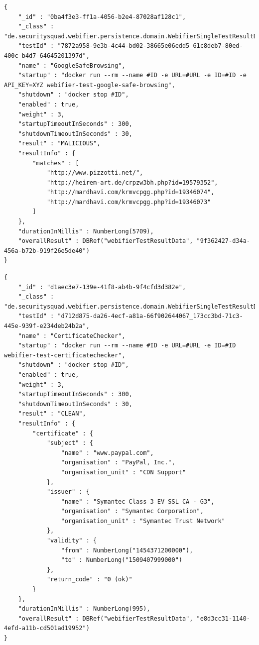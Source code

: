 \begin{scriptsize}
\begin{lstlisting}
{
    "_id" : "0ba4f3e3-ff1a-4056-b2e4-87028af128c1",
    "_class" : "de.securitysquad.webifier.persistence.domain.WebifierSingleTestResultData",
    "testId" : "7872a958-9e3b-4c44-bd02-38665e06edd5_61c8deb7-80ed-400c-b4d7-64645201397d",
    "name" : "GoogleSafeBrowsing",
    "startup" : "docker run --rm --name #ID -e URL=#URL -e ID=#ID -e API_KEY=XYZ webifier-test-google-safe-browsing",
    "shutdown" : "docker stop #ID",
    "enabled" : true,
    "weight" : 3,
    "startupTimeoutInSeconds" : 300,
    "shutdownTimeoutInSeconds" : 30,
    "result" : "MALICIOUS",
    "resultInfo" : {
        "matches" : [
            "http://www.pizzotti.net/",
            "http://heirem-art.de/crpzw3bh.php?id=19579352",
            "http://mardhavi.com/krmvcpgg.php?id=19346074",
            "http://mardhavi.com/krmvcpgg.php?id=19346073"
        ]
    },
    "durationInMillis" : NumberLong(5709),
    "overallResult" : DBRef("webifierTestResultData", "9f362427-d34a-456a-b72b-919f26e5de40")
}
\end{lstlisting}
\end{scriptsize}

\newpage

\begin{scriptsize}
\begin{lstlisting}
{
    "_id" : "d1aec3e7-139e-41f8-ab4b-9f4cfd3d382e",
    "_class" : "de.securitysquad.webifier.persistence.domain.WebifierSingleTestResultData",
    "testId" : "d712d875-da26-4ecf-a81a-66f902644067_173cc3bd-71c3-445e-939f-e234deb24b2a",
    "name" : "CertificateChecker",
    "startup" : "docker run --rm --name #ID -e URL=#URL -e ID=#ID webifier-test-certificatechecker",
    "shutdown" : "docker stop #ID",
    "enabled" : true,
    "weight" : 3,
    "startupTimeoutInSeconds" : 300,
    "shutdownTimeoutInSeconds" : 30,
    "result" : "CLEAN",
    "resultInfo" : {
        "certificate" : {
            "subject" : {
                "name" : "www.paypal.com",
                "organisation" : "PayPal, Inc.",
                "organisation_unit" : "CDN Support"
            },
            "issuer" : {
                "name" : "Symantec Class 3 EV SSL CA - G3",
                "organisation" : "Symantec Corporation",
                "organisation_unit" : "Symantec Trust Network"
            },
            "validity" : {
                "from" : NumberLong("1454371200000"),
                "to" : NumberLong("1509407999000")
            },
            "return_code" : "0 (ok)"
        }
    },
    "durationInMillis" : NumberLong(995),
    "overallResult" : DBRef("webifierTestResultData", "e8d3cc31-1140-4efd-a11b-cd501ad19952")
}
\end{lstlisting}
\end{scriptsize}

